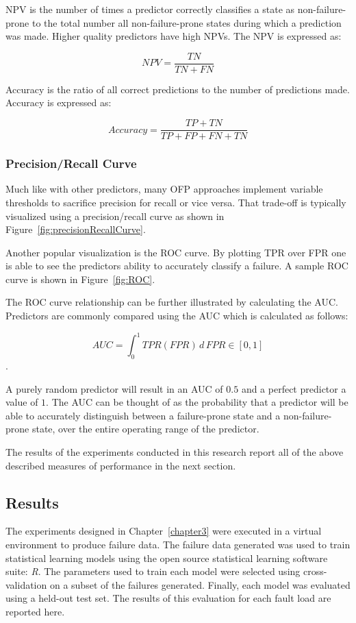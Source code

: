 \ac{NPV} is the number of times a predictor correctly classifies a state as
non-failure-prone to the total number all non-failure-prone states during which
a prediction was made.  Higher quality predictors have high \ac{NPV}s.  The
\ac{NPV} is expressed as:

\[ \mathit{NPV}
	= \dfrac{TN}{TN + FN}
\]

Accuracy is the ratio of all correct predictions to the number of predictions
made.  Accuracy is expressed as:

\[ Accuracy 
	= \dfrac{TP + TN}{TP + FP + FN + TN}
\]

\subsubsection{Precision/Recall Curve}
Much like with other predictors, many \ac{OFP} approaches implement variable
thresholds to sacrifice precision for recall or vice versa.  That trade-off is
typically visualized using a precision/recall curve as shown in
Figure~\ref{fig:precisionRecallCurve}.

\figprecisionRecallCurve{3in}

Another popular visualization is the \ac{ROC} curve.  By plotting \ac{TPR} over
\ac{FPR} one is able to see the predictors ability to accurately classify a
failure.  A sample \ac{ROC} curve is shown in Figure~\ref{fig:ROC}.

\figROC{3in}

The \ac{ROC} curve relationship can be further illustrated by calculating the
\ac{AUC}.  Predictors are commonly compared using the \ac{AUC} which is
calculated as follows:

$$AUC = \int_{0}^{1} \mathit{TPR}(\mathit{FPR}) \,d\,\mathit{FPR} \in [0,1]$$.

A purely random predictor will result in an \ac{AUC} of $0.5$ and a perfect
predictor a value of $1$.  The \ac{AUC} can be thought of as the probability
that a predictor will be able to accurately distinguish between a failure-prone
state and a non-failure-prone state, over the entire operating range of the
predictor.

The results of the experiments conducted in this research report all of the
above described measures of performance in the next section.

\subsection{Results} \label{results}
The experiments designed in Chapter~\ref{chapter3} were executed in a virtual
environment to produce failure data.  The failure data generated was used to
train statistical learning models using the open source statistical learning
software suite: \emph{R}.  The parameters used to train each model were
selected using cross-validation on a subset of the failures generated.
Finally, each model was evaluated using a held-out test set.  The results of
this evaluation for each fault load are reported here.

